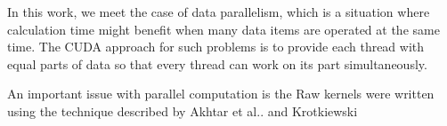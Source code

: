In this work, we meet the case of data parallelism\cite{cheng2014professional}, which is a situation where calculation time might benefit when many data items are operated at the same time. The CUDA approach for such problems is to provide each thread with equal parts of data so that every thread can work on its part simultaneously.

An important issue with parallel computation is the 
Raw kernels were written using the technique described by Akhtar et al.\cite{akhtar2018efficient}. and Krotkiewski \cite{krotkiewski2013efficient}



\cite{learn_cuda}
\cite{cheng2014professional}





